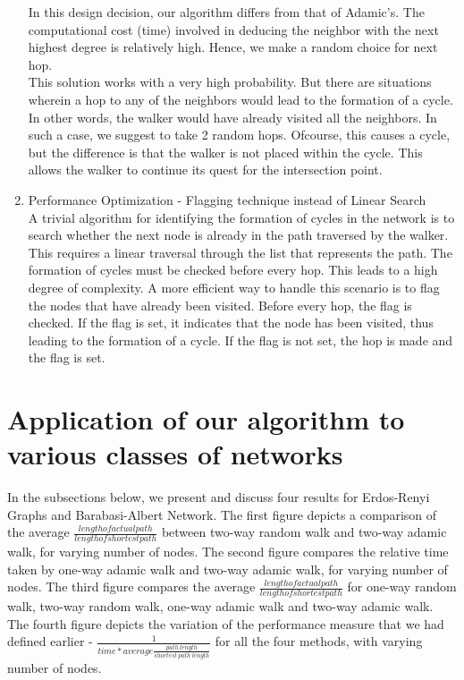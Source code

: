 \documentclass[a4paper,12pt]{article}
\begin{document}
\begin{enumerate}
In this design decision, our algorithm differs from that of Adamic's. The computational cost (time) involved in deducing the neighbor with the next highest degree is relatively high. Hence, we make a random choice for next hop.\\

This solution works with a very high probability. But there are situations wherein a hop to any of the neighbors would lead to the formation of a cycle. In other words, the walker would have already visited all the neighbors. In such a case, we suggest to take 2 random hops. Ofcourse, this causes a cycle, but the difference is that the walker is not placed within the cycle. This allows the walker to continue its quest for the intersection point.\\

\item Performance Optimization - Flagging technique instead of Linear Search\\
A trivial algorithm for identifying the formation of cycles in the network is to search whether the next node is already in the path traversed by the walker. This requires a linear traversal through the list that represents the path. The formation of cycles must be checked before every hop. This leads to a high degree of complexity. A more efficient way to handle this scenario is to flag the nodes that have already been visited. Before every hop, the flag is checked. If the flag is set, it indicates that the node has been visited, thus leading to the formation of a cycle. If the flag is not set, the hop is made and the flag is set.
\end{enumerate}

\section{Application of our algorithm to various classes of networks}
In the subsections below, we present and discuss four results for Erdos-Renyi Graphs and Barabasi-Albert Network. The first figure depicts a comparison of the average $\frac{length of actual path}{length of shortest path}$ between two-way random walk and two-way adamic walk, for varying number of nodes. The second figure compares the relative time taken by one-way adamic walk and two-way adamic walk, for varying number of nodes. The third figure compares the average $\frac{length of actual path}{length of shortest path}$ for one-way random walk, two-way random walk, one-way adamic walk and two-way adamic walk. The fourth figure depicts the variation of the performance measure that we had defined earlier - $\frac{1}{time*average \frac{path\ length}{shortest\ path\ length}}$ for all the four methods, with varying number of nodes.
\end{document}
